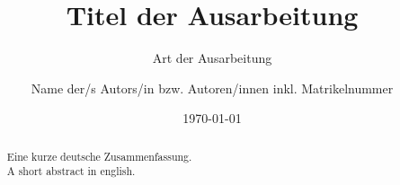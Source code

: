 \documentclass[BCOR=1cm, twoside, ngerman]{scrreprt}
\title{Titel der Ausarbeitung}
\subtitle{Art der Ausarbeitung}
\author{Name der/s Autors/in bzw. Autoren/innen inkl. Matrikelnummer}
\date{\today} %
\begin{document}
\maketitle

\begin{abstract}
Eine kurze deutsche Zusammenfassung.\\

A short abstract in english.
\end{abstract}

\tableofcontents
\printbibliography[heading=bibintoc, title={Literaturverzeichnis}]




% 
% 
% 
\end{document}

